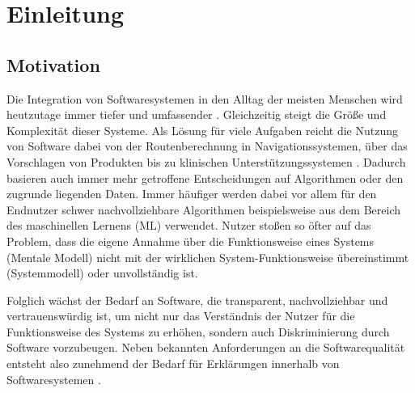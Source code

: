 \chapter{Einleitung}

\section{Motivation}

Die Integration von Softwaresystemen in den Alltag der meisten Menschen wird heutzutage immer tiefer und umfassender \cite{carvalho2020developers}.  Gleichzeitig steigt die Größe und Komplexität dieser Systeme. Als Lösung für viele Aufgaben reicht die Nutzung von Software dabei von der Routenberechnung in Navigationssystemen, über das Vorschlagen von Produkten bis zu klinischen Unterstützungssystemen \cite{chazette2020explainability, tintarev2015explaining, cypko2017guide}. Dadurch basieren auch immer mehr getroffene Entscheidungen auf Algorithmen oder den zugrunde liegenden Daten. Immer häufiger werden dabei vor allem für den Endnutzer schwer nachvollziehbare Algorithmen beispielsweise aus dem Bereich des maschinellen Lernens (ML) verwendet. Nutzer stoßen so öfter auf das Problem, dass die eigene Annahme über die Funktionsweise eines Systems (Mentale Modell) nicht mit der wirklichen System-Funktionsweise übereinstimmt (Systemmodell) oder unvollständig ist.

Folglich wächst der Bedarf an Software, die transparent, nachvollziehbar und vertrauenswürdig ist, um nicht nur das Verständnis der Nutzer für die Funktionsweise des Systems zu erhöhen, sondern auch Diskriminierung durch Software vorzubeugen. Neben bekannten Anforderungen an die Softwarequalität \cite{international2011iso} entsteht also zunehmend der Bedarf für Erklärungen innerhalb von Softwaresystemen \cite{chazette_end-users_nodate}.

